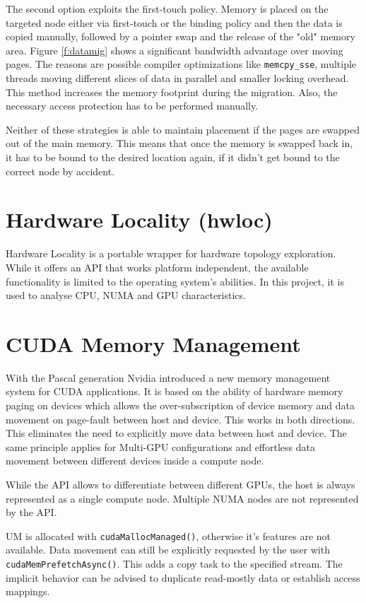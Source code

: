 The second option exploits the first-touch policy. Memory is placed on the targeted node either via first-touch or the binding policy and 
then the data is copied manually, followed by a pointer swap and the release of the "old"
memory area. Figure \ref{f:datamig} shows a significant bandwidth advantage over moving pages. The reasons are possible compiler optimizations like \verb|memcpy_sse|, multiple threads moving different slices of data in parallel and smaller locking overhead.
This method increases the memory footprint during the migration. Also, the necessary access protection has to be performed manually.

Neither of these strategies is able to maintain placement if the pages are swapped out of the main memory. This means that once the memory
is swapped back in, it has to be bound to the desired location again, if it didn't get bound to the correct
node by accident.

\section{Hardware Locality (hwloc)}
Hardware Locality is a portable wrapper for hardware topology exploration.
While it offers an API that works platform independent, the available functionality is limited to the operating system's abilities. In this project, it is used to analyse CPU, NUMA and GPU characteristics. \cite{HWLOC:doc}

\section{CUDA Memory Management}
With the Pascal generation Nvidia introduced a new memory management system for CUDA applications. It is based on the ability of hardware memory paging on devices which allows the over-subscription of device memory and data movement on page-fault between host and device. This works in both directions. This eliminates the need to 
explicitly move data between host and device. The same principle applies for Multi-GPU configurations and effortless data movement between different devices inside a compute node.

While the API allows to differentiate between different GPUs, the host is always represented as a single compute node. Multiple NUMA nodes are not represented by the API.

UM is allocated with \verb|cudaMallocManaged()|, otherwise it's features are not available. Data movement can still be explicitly requested by the user with \verb|cudaMemPrefetchAsync()|. This adds a copy task to the specified stream. The implicit behavior can be advised to duplicate read-mostly data or establish access mappings.

